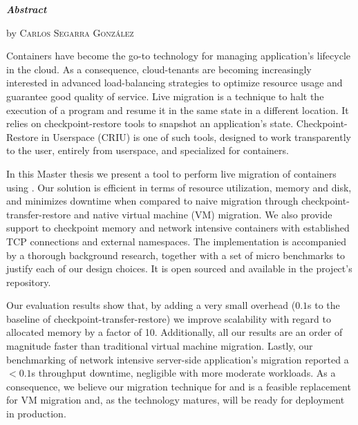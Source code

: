 \vspace*{1.50cm}
\begin{center}

    \LARGE
    \textit{\textbf{Abstract}} \label{sec:abstract}

    \vspace{0.5cm}

    \large
    \textbf{\titleEN}

    by \textsc{Carlos Segarra Gonz\'alez}
\end{center}

\vspace{0.5cm}

\normalsize
Containers have become the go-to technology for managing application's lifecycle in the cloud.
As a consequence, cloud-tenants are becoming increasingly interested in advanced load-balancing strategies to optimize resource usage and guarantee good quality of service.
Live migration is a technique to halt the execution of a program and resume it in the same state in a different location.
It relies on checkpoint-restore tools to snapshot an application's state.
Checkpoint-Restore in Userspace (CRIU) is one of such tools, designed to work transparently to the user, entirely from userspace, and specialized for containers.

In this Master thesis we present a tool to perform live migration of \runc containers using \criu.
Our solution is efficient in terms of resource utilization, memory and disk, and minimizes downtime when compared to naive migration through checkpoint-transfer-restore and native virtual machine (VM) migration.
We also provide support to checkpoint memory and network intensive containers with established TCP connections and external namespaces.
The implementation is accompanied by a thorough background research, together with a set of micro benchmarks to justify each of our design choices.
It is open sourced and available in the project's repository.

Our evaluation results show that, by adding a very small overhead ($0.1$s to the baseline of checkpoint-transfer-restore) we improve scalability with regard to allocated memory by a factor of 10.
Additionally, all our results are an order of magnitude faster than traditional virtual machine migration.
Lastly, our benchmarking of network intensive server-side application's migration reported a $< 0.1$s throughput downtime, negligible with more moderate workloads.
As a consequence, we believe our migration technique for \criu and \runc is a feasible replacement for VM migration and, as the technology matures, will be ready for deployment in production.

